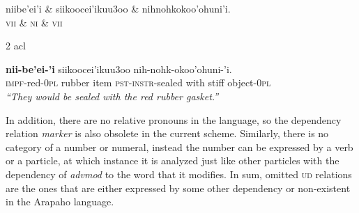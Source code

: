 \documentclass[11pt]{article}
\begin{document}
\small
\begin{exe}
\ex \label{acl}%
\begin{adjustwidth*}{-0.1in}{-0.1in}
\begin{dependency}
\begin{deptext}
niibe'ei'i \& siikoocei'ikuu3oo \& nihnohkokoo'ohuni'i.\\
\textsc{vii} \& \textsc{ni} \& \textsc{vii}\\
\end{deptext}
	{2}	{acl}
\end{dependency}
\gll \textbf{nii-be'ei-'i} siikoocei'ikuu3oo nih-nohk-okoo'ohuni-'i.\\
{\textsc{impf}-red-\textsc{0pl}} {rubber item} {\textsc{pst-instr}-sealed with stiff object-\textsc{0pl}}\\
\trans \textit{``They would be sealed with the red rubber gasket.''}
\end{adjustwidth*}
\end{exe}
\normalsize
In addition, there are no relative pronouns in the language, so the dependency relation \textit{marker} is also obsolete in the current scheme. Similarly, there is no category of a number or numeral, instead the number can be expressed by a verb or a particle, at which instance it is analyzed just like other particles with the dependency of \textit{advmod} to the word that it modifies. In sum, omitted \textsc{ud} relations are the ones that are either expressed by some other dependency or non-existent in the Arapaho language. 
\end{document}
